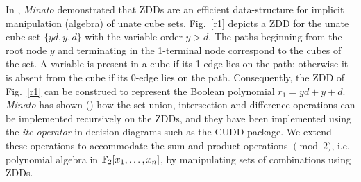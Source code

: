In \cite{zbdd_unate}, {\it Minato} demonstrated that ZDDs are an
efficient data-structure for implicit manipulation (algebra) of unate
cube sets. Fig.~\ref{r1} depicts a ZDD for the unate cube set
$\{yd,y,d\}$ with the variable order  $y > d$. The paths beginning
from the root node $y$ and terminating in the 1-terminal node
correspond to the cubes of the set. A variable is present in a cube if
its 1-edge lies on the path; otherwise it is absent from the cube
if its 0-edge lies on the path. 
Consequently, the ZDD of Fig.~\ref{r1} can be construed to
represent the Boolean polynomial $r_1 = yd + y +d$. {\it Minato} has
shown (\cite{zbdd}\cite{zbdd_unate}) how the set union, intersection and
difference operations can be implemented recursively on the ZDDs, 
and they have been implemented using the {\it ite-operator} in
decision diagrams such as the CUDD \cite{cudd} package. We extend
these operations to accommodate the sum and product operations
$\pmod{2}$, i.e. polynomial algebra in ${\mathbb{F}}_{2}[x_1,\dots,x_n]$, by 
manipulating sets of combinations using ZDDs. 





